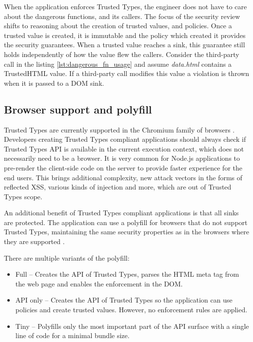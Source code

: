When the application enforces Trusted Types, the engineer does not have to care about the dangerous
functions, and its callers. The focus of the security review shifts to reasoning about the creation
of trusted values, and policies. Once a trusted value is created, it is immutable and the policy
which created it provides the security guarantees. When a trusted value reaches a sink, this
guarantee still holds independently of how the value flew the callers. Consider the third-party call
in the listing \ref{lst:dangerous_fn_usage} and assume \emph{data.html} contains a TrustedHTML
value. If a third-party call modifies this value a violation is thrown when it is passed to a DOM
sink.

\subsection{Browser support and polyfill}

Trusted Types are currently supported in the Chromium family of browsers
\cite{mdn:tt_compatibility}. Developers creating Trusted Types compliant applications should always
check if Trusted Types API is available in the current execution context, which does not necessarily
need to be a browser. It is very common for Node.js applications to pre-render the client-side code
on the server to provide faster experience for the end users. This brings additional complexity, new
attack vectors in the forms of reflected XSS, various kinds of injection and more, which are out of
Trusted Types scope.

An additional benefit of Trusted Types compliant applications is that all sinks are protected. The
application can use a polyfill for browsers that do not support Trusted Types, maintaining the same
security properties as in the browsers where they are supported \cite{xss_nowhere_with_polyfill}.

There are multiple variants of the polyfill:

\begin{itemize}
  \item Full -- Creates the API of Trusted Types, parses the HTML meta tag from the web page
        and enables the enforcement in the DOM.
  \item API only -- Creates the API of Trusted Types so the application can use policies and create
        trusted values. However, no enforcement rules are applied.
  \item Tiny -- Polyfills only the most important part of the API surface with a single line of code
        for a minimal bundle size.
\end{itemize}

